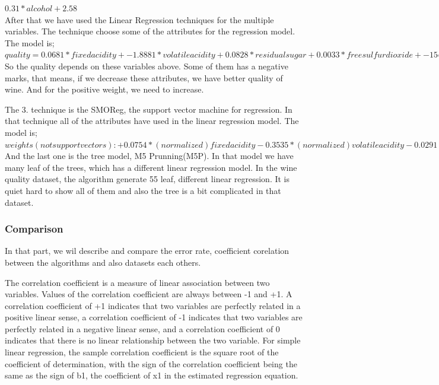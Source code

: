 \documentclass[a4paper]{article}
\begin{document}
$0.31 * alcohol + 2.58$\\

After that we have used the Linear Regression techniques for the multiple variables. The technique choose some of the attributes for the regression model. The model is;\\
$quality =
      0.0681 * fixed acidity +
     -1.8881 * volatile acidity +
      0.0828 * residual sugar +
      0.0033 * free sulfur dioxide +
   -154.2913 * density +
      0.6942 * pH +
      0.6285 * sulphates +
      0.1932 * alcohol +
    154.1062$\\

So the quality depends on these variables above. Some of them has a negative marks, that means, if we decrease these attributes, we have better quality of wine. And for the positive weight, we need to increase.

The 3. technique is the SMOReg, the support vector machine for regression. In that technique all of the attributes have used in the linear regression model. The model is;\\
$weights (not support vectors):
 +       0.0754 * (normalized) fixed acidity
 -       0.3535 * (normalized) volatile acidity
 -       0.0291 * (normalized) citric acid
 +       0.7259 * (normalized) residual sugar
 -       0.0609 * (normalized) chlorides
 +       0.2402 * (normalized) free sulfur dioxide
 -       0.049  * (normalized) total sulfur dioxide
 -       0.9238 * (normalized) density
 +       0.1421 * (normalized) pH
 +       0.1072 * (normalized) sulphates
 +       0.2417 * (normalized) alcohol
 +       0.3849$\\

And the last one is the tree model, M5 Prunning(M5P). In that model we have many leaf of the trees, which has a different linear regression model. In the wine quality dataset, the algorithm generate 55 leaf, different linear regression. It is quiet hard to show all of them and also the tree is a bit complicated in that dataset.


\subsubsection{Comparison}

In that part, we wil describe and compare the error rate, coefficient corelation between the algorithms and also datasets each others. 

The correlation coefficient is a measure of linear association between two variables. Values of the correlation coefficient are always between -1 and +1. A correlation coefficient of +1 indicates that two variables are perfectly related in a positive linear sense, a correlation coefficient of -1 indicates that two variables are perfectly related in a negative linear sense, and a correlation coefficient of 0 indicates that there is no linear relationship between the two variable. For simple linear regression, the sample correlation coefficient is the square root of the coefficient of determination, with the sign of the correlation coefficient being the same as the sign of b1, the coefficient of x1 in the estimated regression equation.
\end{document}
